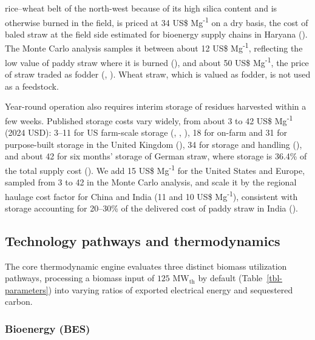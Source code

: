 \documentclass[
  letterpaper,
]{article}
\begin{document}
\begin{itemize}
  rice--wheat belt of the north-west because of its high silica content
  and is otherwise burned in the field, is priced at 34 US\$
  Mg\textsuperscript{-1} on a dry basis, the cost of baled straw at the
  field side estimated for bioenergy supply chains in Haryana
  (). The Monte Carlo analysis
  samples it between about 12 US\$ Mg\textsuperscript{-1}, reflecting
  the low value of paddy straw where it is burned
  (), and about 50 US\$
  Mg\textsuperscript{-1}, the price of straw traded as fodder
  (,
  ). Wheat straw, which is valued as
  fodder, is not used as a feedstock.
\end{itemize}

Year-round operation also requires interim storage of residues harvested
within a few weeks. Published storage costs vary widely, from about 3 to
42 US\$ Mg\textsuperscript{-1} (2024 USD): 3--11 for US farm-scale
storage (,
,
), 18 for on-farm and 31 for
purpose-built storage in the United Kingdom
(), 34 for storage and handling
(), and about 42 for six months'
storage of German straw, where storage is 36.4\% of the total supply
cost (). We add 15 US\$
Mg\textsuperscript{-1} for the United States and Europe, sampled from 3
to 42 in the Monte Carlo analysis, and scale it by the regional haulage
cost factor for China and India (11 and 10 US\$ Mg\textsuperscript{-1}),
consistent with storage accounting for 20--30\% of the delivered cost of
paddy straw in India ().

\subsection{Technology pathways and
thermodynamics}\label{technology-pathways-and-thermodynamics}

The core thermodynamic engine evaluates three distinct biomass
utilization pathways, processing a biomass input of
\(125\text{ MW}_{\text{th}}\) by default (Table~\ref{tbl-parameters})
into varying ratios of exported electrical energy and sequestered
carbon.

\subsubsection{Bioenergy (BES)}\label{bioenergy-bes}
\end{document}
